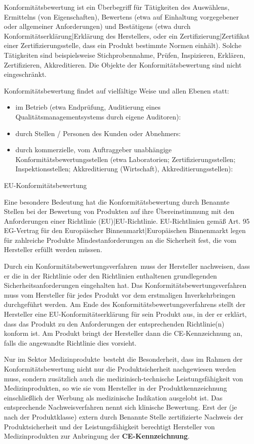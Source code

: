Konformitätsbewertung ist ein Überbegriff für Tätigkeiten des Auswählens, Ermittelns (von Eigenschaften), Bewertens (etwa auf Einhaltung vorgegebener oder allgemeiner Anforderungen) und Bestätigens (etwa durch Konformitätserklärung|Erklärung des Herstellers, oder ein Zertifizierung|Zertifikat einer Zertifizierungsstelle, dass ein Produkt bestimmte Normen einhält). Solche Tätigkeiten sind beispielsweise Stichprobennahme, Prüfen, Inspizieren, Erklären, Zertifizieren, Akkreditieren. Die Objekte der Konformitätsbewertung sind nicht eingeschränkt.

Konformitätsbewertung findet auf vielfältige Weise und allen Ebenen statt: 
\begin{itemize}
\item im Betrieb (etwa Endprüfung, Auditierung eines Qualitätsmanagementsystems durch eigene Auditoren):
\item durch Stellen / Personen des Kunden oder Abnehmers: 
\item durch kommerzielle, vom Auftraggeber unabhängige Konformitätsbewertungsstellen (etwa Laboratorien; Zertifizierungsstellen; Inspektionsstellen; Akkreditierung (Wirtschaft), Akkreditierungsstellen): 
\end{itemize}

EU-Konformitätsbewertung

Eine besondere Bedeutung hat die Konformitätsbewertung durch Benannte Stellen bei der Bewertung von Produkten auf ihre Übereinstimmung mit den Anforderungen einer Richtlinie (EU)|EU-Richtlinie. EU-Richtlinien gemäß Art. 95 EG-Vertrag für den Europäischer Binnenmarkt|Europäischen Binnenmarkt legen für zahlreiche Produkte Mindestanforderungen an die Sicherheit fest, die vom Hersteller erfüllt werden müssen.

Durch ein \glqq Konformitätsbewertungsverfahren\grqq~muss der Hersteller nachweisen, dass er die in der Richtlinie oder den Richtlinien enthaltenen grundlegenden Sicherheitsanforderungen eingehalten hat. Das Konformitätsbewertungsverfahren muss vom Hersteller für jedes Produkt vor dem erstmaligen Inverkehrbringen durchgeführt werden. Am Ende des Kon\-formitäts\-bewertungs\-verfahrens stellt der Hersteller eine EU-Konformitätserklärung für sein Produkt aus, in der er erklärt, dass das Produkt zu den Anforderungen der entsprechenden Richtlinie(n) konform ist. Am Produkt bringt der Hersteller dann die CE-Kennzeichnung an, falls die angewandte Richtlinie dies vorsieht.

Nur im Sektor \glqq Medizinprodukte\grqq~besteht die Besonderheit, dass im Rahmen der Konformitätsbewertung nicht nur die Produktsicherheit nachgewiesen werden muss, sondern zusätzlich auch die medizinisch-technische Leistungsfähigkeit von Medizinprodukten, so wie sie vom Hersteller in der Produktkennzeichnung einschließlich der Werbung als medizinische Indikation ausgelobt ist. Das entsprechende Nachweisverfahren nennt sich klinische Bewertung. Erst der (je nach der Produktklasse) extern durch Benannte Stelle zertifizierte Nachweis der Produktsicherheit und der Leistungsfähigkeit berechtigt Hersteller von Medizinprodukten zur Anbringung der \textbf{CE-Kennzeichnung}.


